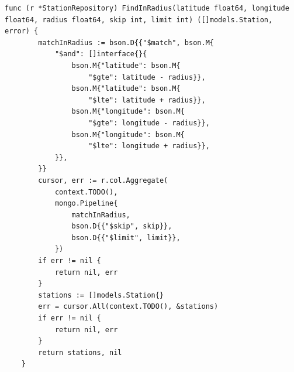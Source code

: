 \begin{lstlisting}[label=list:repo_read_station_FindInRadius,caption=Wyszukiwanie stacji ładowania w bazie danych w pobliżu podanych współrzędnych na mapie Ziemi,basicstyle=\tiny\ttfamily]
    func (r *StationRepository) FindInRadius(latitude float64, longitude float64, radius float64, skip int, limit int) ([]models.Station, error) {
        matchInRadius := bson.D{{"$match", bson.M{
            "$and": []interface{}{
                bson.M{"latitude": bson.M{
                    "$gte": latitude - radius}},
                bson.M{"latitude": bson.M{
                    "$lte": latitude + radius}},
                bson.M{"longitude": bson.M{
                    "$gte": longitude - radius}},
                bson.M{"longitude": bson.M{
                    "$lte": longitude + radius}},
            }},
        }}
        cursor, err := r.col.Aggregate(
            context.TODO(),
            mongo.Pipeline{
                matchInRadius,
                bson.D{{"$skip", skip}},
                bson.D{{"$limit", limit}},
            })
        if err != nil {
            return nil, err
        }
        stations := []models.Station{}
        err = cursor.All(context.TODO(), &stations)
        if err != nil {
            return nil, err
        }
        return stations, nil
    }
\end{lstlisting}
